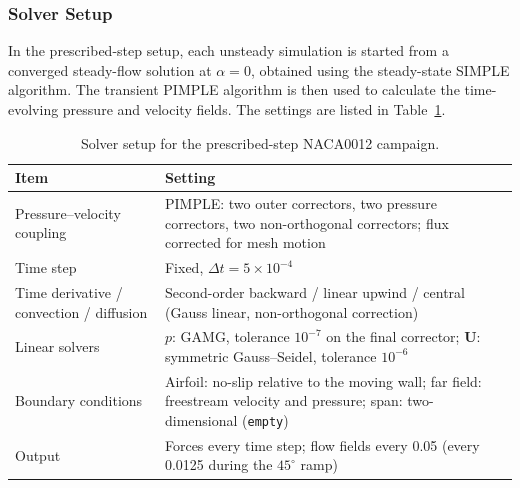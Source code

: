 \subsubsection{Solver Setup}
In the prescribed-step setup, each unsteady simulation is started from a converged steady-flow solution at $\alpha=0$, obtained using the steady-state SIMPLE algorithm. The transient PIMPLE algorithm is then used to calculate the time-evolving pressure and velocity fields. The settings are listed in Table~\ref{tab:pitch_solver}.

\begin{table}[htbp]\centering\small
\caption{Solver setup for the prescribed-step NACA0012 campaign.}\label{tab:pitch_solver}
\begin{tabularx}{\linewidth}{@{}>{\raggedright\arraybackslash}p{.28\linewidth}X@{}}
\toprule Item & Setting \\
\midrule
Pressure--velocity coupling & PIMPLE: two outer correctors, two pressure correctors, two non-orthogonal correctors; flux corrected for mesh motion \\
Time step & Fixed, $\Delta t=5\times10^{-4}$ \\
Time derivative / convection / diffusion & Second-order backward / linear upwind / central (Gauss linear, non-orthogonal correction) \\
Linear solvers & $p$: GAMG, tolerance $10^{-7}$ on the final corrector; $\mathbf{U}$: symmetric Gauss--Seidel, tolerance $10^{-6}$ \\
Boundary conditions & Airfoil: no-slip relative to the moving wall; far field: freestream velocity and pressure; span: two-dimensional (\texttt{empty}) \\
Output & Forces every time step; flow fields every 0.05 (every 0.0125 during the $45^\circ$ ramp) \\
\bottomrule
\end{tabularx}
\end{table}

